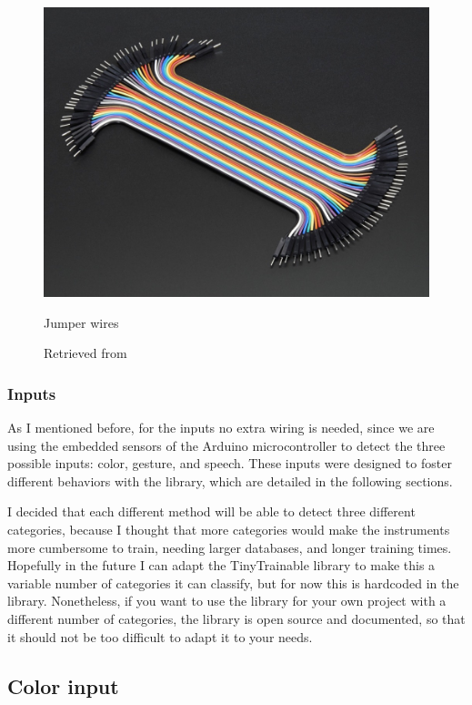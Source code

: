 \begin{figure}[ht]
  \centering
  \includegraphics[width=0.75\linewidth,height=0.25\textheight,keepaspectratio]{images/materials-adafruit-jumper-wires.jpg}
  \caption{Jumper wires}
  \caption*{Retrieved from \cite{website-materials-adafruit-jumper-wires}}
  \label{fig:materials-adafruit-jumper-wires}
\end{figure}

\subsubsection{Inputs}

As I mentioned before, for the inputs no extra wiring is needed, since we are using the embedded sensors of the Arduino microcontroller to detect the three possible inputs: color, gesture, and speech. These inputs were designed to foster different behaviors with the library, which are detailed in the following sections.

I decided that each different method will be able to detect three different categories, because I thought that more categories would make the instruments more cumbersome to train, needing larger databases, and longer training times. Hopefully in the future I can adapt the TinyTrainable library to make this a variable number of categories it can classify, but for now this is hardcoded in the library. Nonetheless, if you want to use the library for your own project with a different number of categories, the library is open source and documented, so that it should not be too difficult to adapt it to your needs.

\subsection{Color input}

